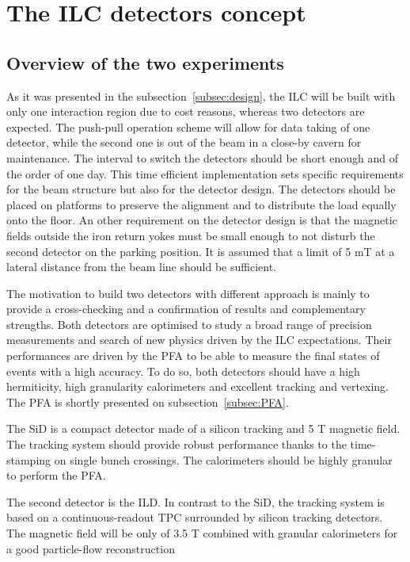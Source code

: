   \section{The ILC detectors concept}
  \label{sec:detectors}

    \subsection{Overview of the two experiments}
    

  As it was presented in the subsection~\ref{subsec:design}, the \gls{ILC} will be built with only one interaction region due to cost reasons, whereas two detectors are expected.
  The push-pull operation scheme will allow for data taking of one detector, while the second one is out of the beam in a close-by cavern for maintenance.
  The interval to switch the detectors should be short enough and of the order of one day.
  This time efficient implementation sets specific requirements for the beam structure but also for the detector design.
  The detectors should be placed on platforms to preserve the alignment and to distribute the load equally onto the floor.
  An other requirement on the detector design is that the magnetic fields outside the iron return yokes must be small enough to not disturb the second detector on the parking position.
  It is assumed that a limit of 5 mT at a lateral distance from the beam line should be sufficient.

  The motivation to build two detectors with different approach is mainly to provide a cross-checking and a confirmation of results and complementary strengths.
  Both detectors are optimised to study a broad range of precision measurements and search of new physics driven by the \gls{ILC} expectations.
  Their performances are driven by the \gls{PFA} to be able to measure the final states of events with a high accuracy.
  To do so, both detectors should have a high hermiticity, high granularity calorimeters and excellent tracking and vertexing.
  The \gls{PFA} is shortly presented on subsection~\ref{subsec:PFA}.

  The \gls{SiD} is a compact detector made of a silicon tracking and 5 T magnetic field.
  The tracking system should provide robust performance thanks to the time-stamping on single bunch crossings.
  The calorimeters should be highly granular to perform the \gls{PFA}.

  The second detector is the \gls{ILD}.
  In contrast to the \gls{SiD}, the tracking system is based on a continuous-readout \gls{TPC} surrounded by silicon tracking detectors.
  The magnetic field will be only of 3.5 T combined with granular calorimeters for a good particle-flow reconstruction

